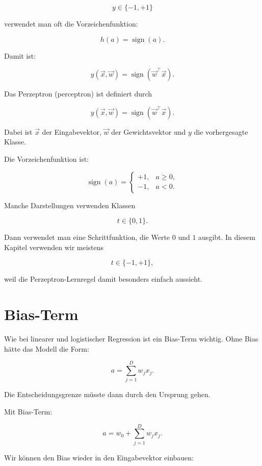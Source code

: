 \[
    y \in \{-1,+1\}
\]

verwendet man oft die Vorzeichenfunktion:

\[
    h(a)
    =
    \operatorname{sign}(a).
\]

Damit ist:

\[
    y(\vec{x},\vec{w})
    =
    \operatorname{sign}(\vec{w}^{\top}\vec{x}).
\]

\begin{definitionbox}
Das Perzeptron (perceptron) ist definiert durch

\[
    y(\vec{x},\vec{w})
    =
    \operatorname{sign}(\vec{w}^{\top}\vec{x}).
\]

Dabei ist \(\vec{x}\) der Eingabevektor, \(\vec{w}\) der Gewichtsvektor und \(y\) die vorhergesagte Klasse.
\end{definitionbox}

Die Vorzeichenfunktion ist:

\[
    \operatorname{sign}(a)
    =
    \begin{cases}
        +1, & a \geq 0, \\
        -1, & a < 0.
    \end{cases}
\]

\begin{notebox}
Manche Darstellungen verwenden Klassen

\[
    t \in \{0,1\}.
\]

Dann verwendet man eine Schrittfunktion, die Werte \(0\) und \(1\) ausgibt.
In diesem Kapitel verwenden wir meistens

\[
    t \in \{-1,+1\},
\]

weil die Perzeptron-Lernregel damit besonders einfach aussieht.
\end{notebox}

\section{Bias-Term}

Wie bei linearer und logistischer Regression ist ein Bias-Term wichtig.
Ohne Bias hätte das Modell die Form:

\[
    a
    =
    \sum_{j=1}^{D}
    w_jx_j.
\]

Die Entscheidungsgrenze müsste dann durch den Ursprung gehen.

Mit Bias-Term:

\[
    a
    =
    w_0
    +
    \sum_{j=1}^{D}
    w_jx_j.
\]

Wir können den Bias wieder in den Eingabevektor einbauen:

